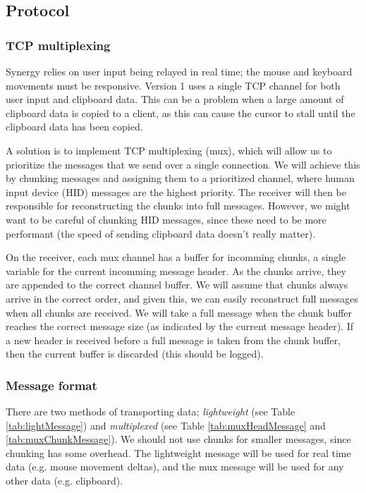 \subsection{Protocol}

\subsubsection{TCP multiplexing}

Synergy relies on user input being relayed in real time; the mouse and keyboard
movements must be responsive. Version 1 uses a single TCP channel for both user
input and clipboard data. This can be a problem when a large amount of clipboard
data is copied to a client, as this can cause the cursor to stall until the
clipboard data has been copied.

A solution is to implement TCP multiplexing (mux), which will 
allow us to prioritize the messages that we send over a single connection. We
will achieve this by chunking messages and assigning them to a prioritized channel,
where human input device (HID) messages are the highest priority. The
receiver will then be responsible for reconstructing the chunks into full 
messages. However, we might want to be careful of chunking HID messages, since 
these need to be more performant (the speed of sending clipboard data doesn't 
really matter).

On the receiver, each mux channel has a buffer for incomming chunks, a single
variable for the current incomming message header. As the chunks arrive, they
are appended to the correct channel buffer. We will assume that chunks always
arrive in the correct order, and given this, we can easily reconstruct full
messages when all chunks are received. We will take a full message when the
chunk buffer reaches the correct message size (as indicated by the current
message header). If a new header is received before a full message is taken
from the chunk buffer, then the current buffer is discarded (this should be
logged).

\subsubsection{Message format}

There are two methods of transporting data; \textit{lightweight} (see Table
\ref{tab:lightMessage}) and \textit{multiplexed} (see Table
\ref{tab:muxHeadMessage} and \ref{tab:muxChunkMessage}). We should not use 
chunks for smaller messages, since chunking has some overhead. The lightweight
message will be used for real time data (e.g. mouse movement deltas), and the
mux message will be used for any other data (e.g. clipboard).

